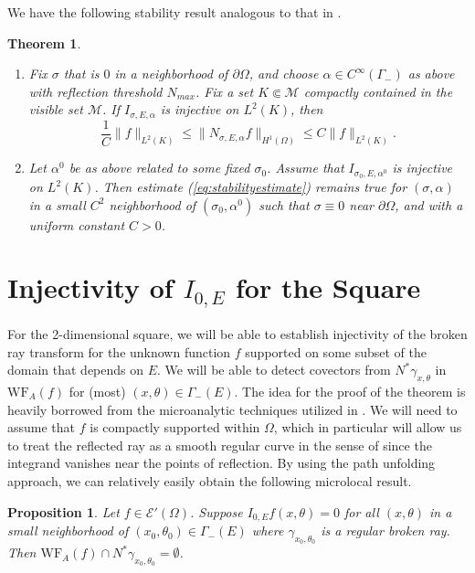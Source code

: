 \documentclass[10pt]{amsart}
\newtheorem{theorem}{Theorem}
\newtheorem{proposition}{Proposition}
\theoremstyle{definition}
\theoremstyle{definition}
\theoremstyle{definition}
\begin{document}
We have the following stability result analogous to that in \cite{xraygeneric}.
\begin{theorem}
\begin{enumerate}
\item[(a)] Fix $\sigma$ that is $0$ in a neighborhood of $\partial \Omega$, and choose $\alpha \in C^{\infty}(\Gamma_{-})$ as above with reflection threshold $N_{max}$. Fix a set $K \Subset \mathcal{M}$ compactly contained in the visible set $\mathcal{M}$. If $I_{\sigma, E, \alpha}$ is injective on $L^{2}(K)$, then
\begin{equation}
\frac{1}{C}\|f\|_{L^{2}(K)} \leq \|N_{\sigma, E, \alpha}f \|_{H^{1}(\Omega)} \leq C\|f\|_{L^{2}(K)}. \label{eq:stabilityestimate}
\end{equation}
\item[(b)] Let $\alpha^{0}$ be as above related to some fixed $\sigma_{0}$. Assume that $I_{\sigma_{0}, E, \alpha^{0}}$ is injective on $L^{2}(K)$. Then estimate (\ref{eq:stabilityestimate}) remains true for $(\sigma, \alpha)$ in a small $C^{2}$ neighborhood of $(\sigma_{0}, \alpha^{0})$ such that $\sigma \equiv 0$ near $\partial \Omega$, and with a uniform constant $C > 0$.
\end{enumerate}\label{thm:stabilityestimate}
\end{theorem}

\section{Injectivity of $I_{0, E}$ for the Square\label{sec:squareinjective}}
For the 2-dimensional square, we will be able to establish injectivity of the broken ray transform for the unknown function $f$ supported on some subset of the domain that depends on $E$. We will be able to detect covectors from $N^{*}\gamma_{x,\theta}$ in $\mathrm{WF}_{A}(f)$ for (most) $(x,\theta)\in \Gamma_{-}(E)$. The idea for the proof of the theorem is heavily borrowed from the microanalytic techniques utilized in \cite{xraygeneric}. We will need to assume that $f$ is compactly supported within $\Omega$, which in particular will allow us to treat the reflected ray as a smooth regular curve in the sense of \cite{xraygeneric} since the integrand vanishes near the points of reflection. By using the path unfolding approach, we can relatively easily obtain the following microlocal result.

\begin{proposition}Let $f \in \mathcal{E}'(\Omega)$. Suppose $I_{0,E}f(x,\theta) = 0$ for all $(x,\theta)$ in a small neighborhood of $(x_{0},\theta_{0}) \in \Gamma_{-}(E)$ where $\gamma_{x_{0},\theta_{0}}$ is a regular broken ray. Then $\mathrm{WF}_{A}(f) \cap N^{*}\gamma_{x_{0},\theta_{0}} = \emptyset$.\label{thm:microlocalsquare}\end{proposition}
\end{document}

